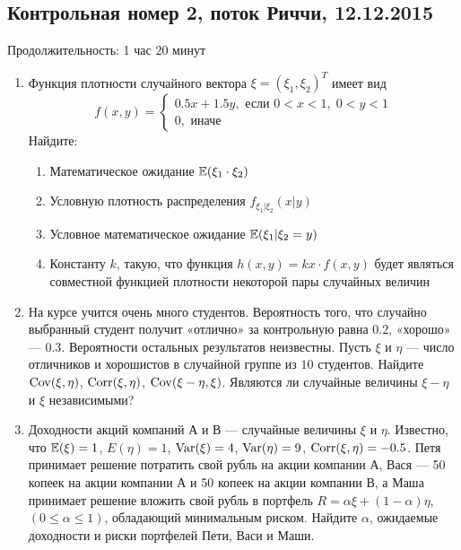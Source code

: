 \subsection{Контрольная номер 2, поток Риччи, 12.12.2015}

Продолжительность: 1 час 20 минут


\begin{enumerate}
\item Функция плотности случайного вектора $\xi=(\xi_1, \xi_2)^T$ имеет вид
\[
f(x,y)=\begin{cases}
0.5x + 1.5y, \text{ если } 0<x<1, \; 0<y<1 \\
0, \text{ иначе }
\end{cases}
\]
Найдите:
\begin{enumerate}
\item Математическое ожидание $\mathbb{E}(\xi_1 \cdot \xi_2)$
\item Условную плотность распределения $f_{\xi_1|\xi_2} (x|y)$
\item Условное математическое ожидание $\mathbb{E}(\xi_1| \xi_2=y)$
\item Константу $k$, такую, что функция $h(x,y)=kx\cdot f(x,y)$ будет являться совместной функцией плотности некоторой пары случайных величин
\end{enumerate}

\item На курсе учится очень много студентов. Вероятность того, что случайно выбранный студент получит «отлично» за контрольную равна $0.2$, «хорошо» — $0.3$. Вероятности остальных результатов неизвестны. Пусть $\xi$ и $\eta$ — число отличников и хорошистов в случайной группе из $10$ студентов. Найдите $\operatorname{Cov}(\xi,\eta)$, $\operatorname{Corr}(\xi,\eta)$, $\operatorname{Cov}(\xi-\eta,\xi)$. Являются ли случайные величины $\xi-\eta$ и $\xi$ независимыми?

\item Доходности акций компаний А и В — случайные величины $\xi$ и $\eta$. Известно, что $\mathbb{E}(\xi)=1$, $E(\eta)=1$, $\operatorname{Var}(\xi)=4$, $\operatorname{Var}(\eta)=9$, $\operatorname{Corr}(\xi,\eta)=-0.5$. Петя принимает решение потратить свой рубль на акции компании А, Вася — 50 копеек на акции компании А и 50 копеек на акции компании В, а Маша  принимает решение вложить свой рубль в портфель $R=\alpha\xi+(1-\alpha)\eta$, $(0 \leq \alpha \leq 1)$, обладающий минимальным риском. Найдите $\alpha$, ожидаемые доходности и риски портфелей Пети, Васи и Маши.


\end{enumerate}
